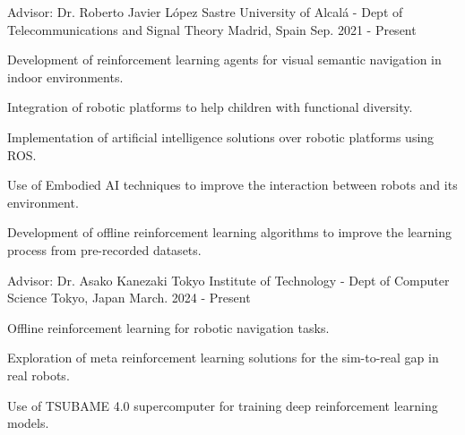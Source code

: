 

\begin{cventries}

    \cventry
    {Advisor: Dr. Roberto Javier López Sastre} %
    {University of Alcalá - Dept of Telecommunications and Signal Theory} %
    {Madrid, Spain} %
    {Sep. 2021 - Present} %
    {
        \begin{cvitems} %
            \item {Development of reinforcement learning agents for visual semantic navigation in indoor environments.}
            \item {Integration of robotic platforms to help children with functional diversity.}
            \item {Implementation of artificial intelligence solutions over robotic platforms using ROS.}
            \item {Use of Embodied AI techniques to improve the interaction between robots and its environment.}
            \item {Development of offline reinforcement learning algorithms to improve the learning process from pre-recorded datasets.}
        \end{cvitems}
    }

    \cventry
    {Advisor: Dr. Asako Kanezaki} %
    {Tokyo Institute of Technology - Dept of Computer Science} %
    {Tokyo, Japan} %
    {March. 2024 - Present} %
    {
        \begin{cvitems} %
            \item {Offline reinforcement learning for robotic navigation tasks.}
            \item {Exploration of meta reinforcement learning solutions for the sim-to-real gap in real robots.}
            \item {Use of TSUBAME 4.0 supercomputer for training deep reinforcement learning models.}
        \end{cvitems}
    }


\end{cventries}
